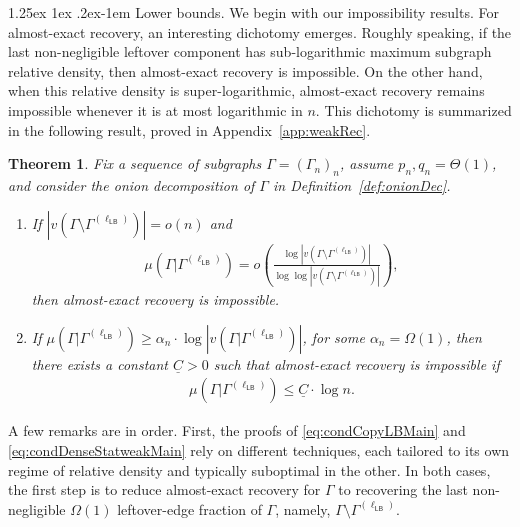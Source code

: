 \documentclass[12pt]{article}
\makeatletter
\newtheorem{theorem}{Theorem}
\newcommand{\p}[1]{\left(#1\right)}
\newcommand{\s}[1]{\mathsf{#1}}
\renewcommand{\paragraph}{%
  \@startsection{paragraph}{4}%
  {\z@}{1.25ex \@plus 1ex \@minus .2ex}{-1em}%
  {\normalfont\normalsize\bfseries}%
}
\makeatother
\begin{document}
\paragraph{Lower bounds.} We begin with our impossibility results. For almost-exact recovery, an interesting dichotomy emerges. Roughly speaking, if the last non-negligible leftover component has sub-logarithmic maximum subgraph relative density, then almost-exact recovery is impossible. On the other hand, when this relative density is super-logarithmic, almost-exact recovery remains impossible whenever it is at most logarithmic in $n$. This dichotomy is summarized in the following result, proved in Appendix~\ref{app:weakRec}.
\begin{theorem}\label{thm:subLogAlmostExactMain}
Fix a sequence of subgraphs $\Gamma=(\Gamma_n)_n$, assume $p_n,q_n=\Theta(1)$, and consider the onion decomposition of $\Gamma$ in Definition~\ref{def:onionDec}. 
\begin{enumerate}
    \item If $|v(\Gamma\setminus\Gamma^{(\ell_{\s{LB}})})|=o(n)$ and
\begin{align}
\mu(\Gamma\vert\Gamma^{(\ell_{\s{LB}})})=o\p{\frac{\log|v(\Gamma\setminus\Gamma^{(\ell_{\s{LB}})})|}{\log \log|v(\Gamma\setminus\Gamma^{(\ell_{\s{LB}})})|}},\label{eq:condCopyLBMain}
\end{align}
then almost-exact recovery is impossible. 
\item If $\mu(\Gamma\vert\Gamma^{(\ell_{\s{LB}})})\geq \alpha_n\cdot \log|v(\Gamma\vert\Gamma^{(\ell_{\s{LB}})})|$, for some $\alpha_n=\Omega(1)$, then there exists a constant $\underline{C}>0$ such that almost-exact recovery is impossible if
    \begin{align}
        \mu(\Gamma\vert\Gamma^{(\ell_{\s{LB}})})\leq \underline{C}\cdot \log n.\label{eq:condDenseStatweakMain}
    \end{align} 
\end{enumerate}
\end{theorem}

A few remarks are in order. First, the proofs of \eqref{eq:condCopyLBMain} and \eqref{eq:condDenseStatweakMain} rely on different techniques, each tailored to its own regime of relative density and typically suboptimal in the other. In both cases, the first step is to reduce almost-exact recovery for $\Gamma$ to recovering the last non-negligible $\Omega(1)$ leftover-edge fraction of $\Gamma$, namely, $\Gamma \setminus \Gamma^{(\ell_{\s{LB}})}$. 
\end{document}
